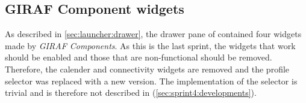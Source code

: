 \subsection{GIRAF Component widgets}
As described in \cref{sec:launcher:drawer}, the drawer pane of \launcher contained four widgets made by \textit{GIRAF Components}.
As this is the last sprint, the widgets that work should be enabled and those that are non-functional should be removed.
Therefore, the calender and connectivity widgets are removed and the profile selector was replaced with a new version.
The implementation of the selector is trivial and is therefore not described in  (\cref{sec:sprint4:developments}).